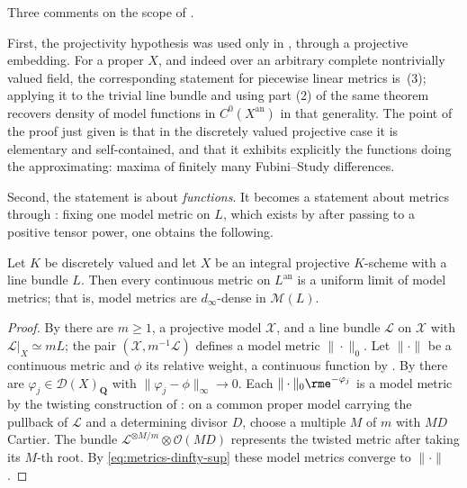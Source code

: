 Three comments on the scope of .

First, the projectivity hypothesis was used only in
, through a projective embedding. For a
proper $X$, and indeed over an arbitrary complete nontrivially valued
field, the corresponding statement for piecewise linear metrics is
\,(3); applying it to the trivial line bundle
and using part (2) of the same theorem recovers density of model functions
in $C^0(X^{\mathrm{an}})$ in that generality. The point of the proof just
given is that in the discretely valued projective case it is elementary and
self-contained, and that it exhibits explicitly the functions doing the
approximating: maxima of finitely many Fubini--Study differences.

Second, the statement is about \emph{functions}. It becomes a statement
about metrics through : fixing one model metric on
$L$, which exists by  after passing to a
positive tensor power, one obtains the following.

\begin{proposition}
\label{prop:metrics-model-metric-density}
Let $K$ be discretely valued and let $X$ be an integral projective
$K$-scheme with a line bundle $L$. Then every continuous metric on
$L^{\mathrm{an}}$ is a uniform limit of model metrics; that is, model
metrics are $d_\infty$-dense in $\mathcal M(L)$.
\end{proposition}

\begin{proof}
By  there are $m\ge1$, a projective model
$\mathcal X$, and a line bundle $\mathcal L$ on $\mathcal X$ with
$\mathcal L|_X\simeq mL$; the pair $(\mathcal X,m^{-1}\mathcal L)$
defines a model metric $\|\cdot\|_0$. Let $\|\cdot\|$ be a continuous
metric and $\phi$ its relative weight, a continuous function by
. By
 there are
$\varphi_j\in\mathcal D(X)_{\mathbf Q}$ with
$\|\varphi_j-\phi\|_\infty\to0$. Each $\|\cdot\|_0\rme^{-\varphi_j}$ is
a model metric by the twisting construction of
: on a common proper model carrying
the pullback of $\mathcal L$ and a determining divisor $D$, choose a
multiple $M$ of $m$ with $MD$ Cartier. The bundle
$\mathcal L^{\otimes M/m}\otimes\mathcal O(MD)$ represents the twisted
metric after taking its $M$-th root. By
\eqref{eq:metrics-dinfty-sup} these model metrics converge to
$\|\cdot\|$.
\end{proof}

